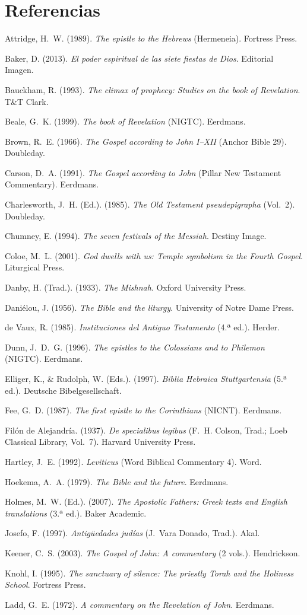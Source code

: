 \documentclass[11pt,letterpaper]{article}
\newcommand{\refapa}[1]{\par{\RaggedRight\hangindent=1.27cm\hangafter=1\noindent #1\par}\vspace{4pt}}
\begin{document}
\section*{Referencias}
\refapa{Attridge, H.~W. (1989). \emph{The epistle to the Hebrews} (Hermeneia). Fortress Press.}
\refapa{Baker, D. (2013). \emph{El poder espiritual de las siete fiestas de Dios}. Editorial Imagen.}
\refapa{Bauckham, R. (1993). \emph{The climax of prophecy: Studies on the book of Revelation}. T\&T Clark.}
\refapa{Beale, G.~K. (1999). \emph{The book of Revelation} (NIGTC). Eerdmans.}
\refapa{Brown, R.~E. (1966). \emph{The Gospel according to John I--XII} (Anchor Bible 29). Doubleday.}
\refapa{Carson, D.~A. (1991). \emph{The Gospel according to John} (Pillar New Testament Commentary). Eerdmans.}
\refapa{Charlesworth, J.~H. (Ed.). (1985). \emph{The Old Testament pseudepigrapha} (Vol.~2). Doubleday.}
\refapa{Chumney, E. (1994). \emph{The seven festivals of the Messiah}. Destiny Image.}
\refapa{Coloe, M.~L. (2001). \emph{God dwells with us: Temple symbolism in the Fourth Gospel}. Liturgical Press.}
\refapa{Danby, H. (Trad.). (1933). \emph{The Mishnah}. Oxford University Press.}
\refapa{Daniélou, J. (1956). \emph{The Bible and the liturgy}. University of Notre Dame Press.}
\refapa{de Vaux, R. (1985). \emph{Instituciones del Antiguo Testamento} (4.ª ed.). Herder.}
\refapa{Dunn, J.~D.~G. (1996). \emph{The epistles to the Colossians and to Philemon} (NIGTC). Eerdmans.}
\refapa{Elliger, K., \& Rudolph, W. (Eds.). (1997). \emph{Biblia Hebraica Stuttgartensia} (5.ª ed.). Deutsche Bibelgesellschaft.}
\refapa{Fee, G.~D. (1987). \emph{The first epistle to the Corinthians} (NICNT). Eerdmans.}
\refapa{Filón de Alejandría. (1937). \emph{De specialibus legibus} (F.~H. Colson, Trad.; Loeb Classical Library, Vol.~7). Harvard University Press.}
\refapa{Hartley, J.~E. (1992). \emph{Leviticus} (Word Biblical Commentary 4). Word.}
\refapa{Hoekema, A.~A. (1979). \emph{The Bible and the future}. Eerdmans.}
\refapa{Holmes, M.~W. (Ed.). (2007). \emph{The Apostolic Fathers: Greek texts and English translations} (3.ª ed.). Baker Academic.}
\refapa{Josefo, F. (1997). \emph{Antigüedades judías} (J.~Vara Donado, Trad.). Akal.}
\refapa{Keener, C.~S. (2003). \emph{The Gospel of John: A commentary} (2 vols.). Hendrickson.}
\refapa{Knohl, I. (1995). \emph{The sanctuary of silence: The priestly Torah and the Holiness School}. Fortress Press.}
\refapa{Ladd, G.~E. (1972). \emph{A commentary on the Revelation of John}. Eerdmans.}
\end{document}
